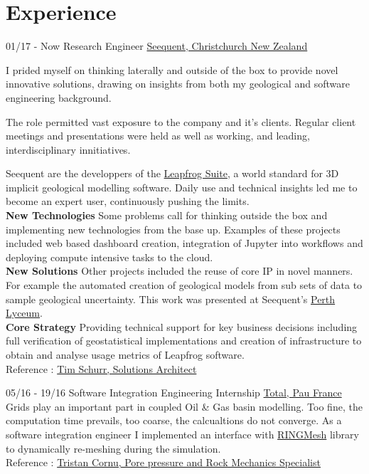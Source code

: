 \documentclass[]{friggeri-cv}
\begin{document}
\section{Experience}
\begin{entrylist}
  \entry
    {01/17 - Now}
    {Research Engineer}
    {\href{https://www.seequent.com/}{Seequent, Christchurch New Zealand}}
    {I prided myself on thinking laterally and outside of the box to provide novel innovative solutions, drawing on insights from both my geological and software engineering background.
    
    The role permitted vast exposure to the company and it's clients. Regular client meetings and presentations were held as well as working, and leading, interdisciplinary innitiatives.
    
    Seequent are the developpers of the \href{https://www.leapfrog3d.com/}{Leapfrog Suite}, a world standard for 3D implicit geological modelling software. Daily use and technical insights led me to become an expert user, continuously pushing the limits.
    \\[6pt]
   	\textbf{New Technologies} Some problems call for thinking outside the box and implementing new technologies from the base up. Examples of these projects included web based dashboard creation, integration of Jupyter into workflows and deploying compute intensive tasks to the cloud.
   	\\[6pt]
   	\textbf{New Solutions} Other projects included the reuse of core IP in novel manners. For example the automated creation of geological models from sub sets of data to sample geological uncertainty. This work was presented at Seequent's \href{https://lyceum-perth.seequent.com/}{Perth Lyceum}.
    \\[6pt]
   	\textbf{Core Strategy} Providing technical support for key business decisions including full verification of geostatistical implementations and creation of infrastructure to obtain and analyse usage metrics of Leapfrog software. 
    \\
    Reference : \href{mailto:tim.schurr@seequent.com}{Tim Schurr, Solutions Architect}
	}
  \entry
    {05/16 - 19/16}
    {Software Integration Engineering Internship}
    {\href{https://www.total.com/en}{Total, Pau France}}
    {Grids play an important part in coupled Oil \& Gas basin modelling. Too fine, the computation time prevails, too coarse, the calcualtions do not converge. As a software integration engineer I implemented an interface with \href{http://www.ring-team.org/software/ringmesh}{RINGMesh} library to dynamically re-meshing during the simulation.\\ Reference : \href{mailto:tristan.cornu@total.com}{Tristan Cornu, Pore pressure and Rock Mechanics Specialist}}
    \end{entrylist}
    
\end{document}
